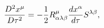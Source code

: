 \begin{equation}
\frac{D^{2}x^{\mu}}{D\tau^{2}}=-\frac{1}{2}R_{\alpha\lambda\beta}^{\mu}\frac{%
dx^{\alpha}}{d\tau}S^{\lambda\beta},  \label{14}
\end{equation}


